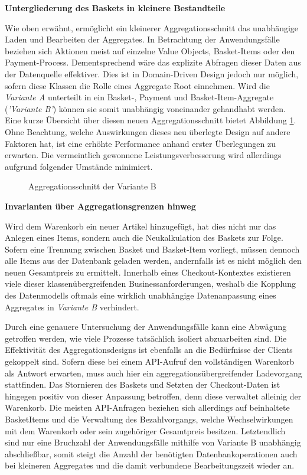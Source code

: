 \textbf{Untergliederung des Baskets in kleinere Bestandteile}

Wie oben erwähnt, ermöglicht ein kleinerer Aggregationsschnitt das unabhängige Laden und Bearbeiten der Aggregates. In Betrachtung der Anwendungsfälle beziehen sich Aktionen meist auf einzelne Value Objects, Basket-Items oder den Payment-Process. Dementsprechend wäre das explizite Abfragen dieser Daten aus der Datenquelle effektiver. Dies ist in Domain-Driven Design jedoch nur möglich, sofern diese Klassen die Rolle eines Aggregate Root einnehmen. Wird die \emph{Variante A} unterteilt in ein Basket-, Payment und Basket-Item-Aggregate (\emph{'Variante B'}) können sie somit unabhängig voneinander gehandhabt werden. Eine kurze Übersicht über diesen neuen Aggregationsschnitt bietet Abbildung \ref{fig:VarB}. Ohne Beachtung, welche Auswirkungen dieses neu überlegte Design auf andere Faktoren hat, ist eine erhöhte Performance anhand erster Überlegungen zu erwarten. Die vermeintlich gewonnene Leistungsverbesserung wird allerdings aufgrund folgender Umstände minimiert.

\begin{figure}[htbp]
	\centering
	
	\caption{Aggregationsschnitt der Variante B}
	\label{fig:VarB}
\end{figure}

\vspace{1em}

\textbf{Invarianten über Aggregationsgrenzen hinweg}

Wird dem Warenkorb ein neuer Artikel hinzugefügt, hat dies nicht nur das Anlegen eines Items, sondern auch die Neukalkulation des Baskets zur Folge. Sofern eine Trennung zwischen Basket und Basket-Item vorliegt, müssen dennoch alle Items aus der Datenbank geladen werden, andernfalls ist es nicht möglich den neuen Gesamtpreis zu ermittelt. Innerhalb eines Checkout-Kontextes existieren viele dieser klassenübergreifenden Businessanforderungen, weshalb die Kopplung des Datenmodells oftmals eine wirklich unabhängige Datenanpassung eines Aggregates in \emph{Variante B} verhindert.

Durch eine genauere Untersuchung der Anwendungsfälle kann eine Abwägung getroffen werden, wie viele Prozesse tatsächlich isoliert abzuarbeiten sind. Die Effektivität des Aggregationsdesigns ist ebenfalls an die Bedürfnisse der Clients gekoppelt sind. Sofern diese bei einem API-Aufruf den vollständigen Warenkorb als Antwort erwarten, muss auch hier ein aggregationsübergreifender Ladevorgang stattfinden. Das Stornieren des Baskets und Setzten der Checkout-Daten ist hingegen positiv von dieser Anpassung betroffen, denn diese verwaltet alleinig der Warenkorb. Die meisten API-Anfragen beziehen sich allerdings auf beinhaltete BasketItems und die Verwaltung des Bezahlvorgangs, welche Wechselwirkungen mit dem Warenkorb oder sein zugehöriger Gesamtpreis besitzen. Letztendlich sind nur eine Bruchzahl der Anwendungsfälle mithilfe von Variante B unabhängig abschließbar, somit steigt die Anzahl der benötigten Datenbankoperationen auch bei kleineren Aggregates und die damit verbundene Bearbeitungszeit wieder an.

